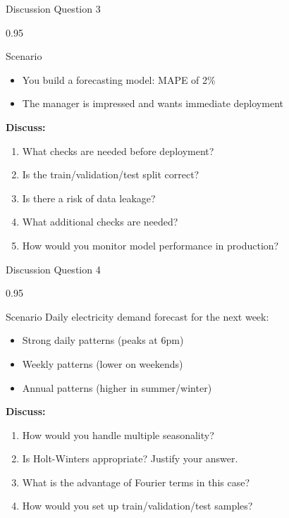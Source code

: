 \documentclass[9pt, aspectratio=169, t]{beamer}
\begin{document}
\begin{frame}{Discussion Question 3}
    \begin{cminipage}{0.95\textwidth}
    \begin{block}{Scenario}
        \begin{itemize}\setlength{\itemsep}{1pt}
            \item You build a forecasting model: MAPE of 2\%
            \item The manager is impressed and wants immediate deployment
        \end{itemize}
    \end{block}

    \vspace{0.4cm}

    \textbf{Discuss:}
    \begin{enumerate}
        \item What checks are needed before deployment?
        \item Is the train/validation/test split correct?
        \item Is there a risk of data leakage?
        \item What additional checks are needed?
        \item How would you monitor model performance in production?
    \end{enumerate}
    \end{cminipage}
\end{frame}

\begin{frame}{Discussion Question 4}
    \begin{cminipage}{0.95\textwidth}
    \begin{block}{Scenario}
        Daily electricity demand forecast for the next week:
        \begin{itemize}\setlength{\itemsep}{1pt}
            \item Strong daily patterns (peaks at 6pm)
            \item Weekly patterns (lower on weekends)
            \item Annual patterns (higher in summer/winter)
        \end{itemize}
    \end{block}

    \vspace{0.4cm}

    \textbf{Discuss:}
    \begin{enumerate}
        \item How would you handle multiple seasonality?
        \item Is Holt-Winters appropriate? Justify your answer.
        \item What is the advantage of Fourier terms in this case?
        \item How would you set up train/validation/test samples?
    \end{enumerate}
    \end{cminipage}
\end{frame}
\end{document}
